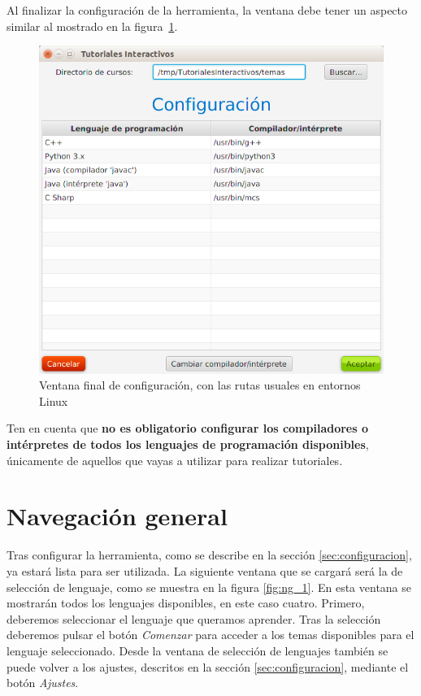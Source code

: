 \documentclass[]{article}
\begin{document}
Al finalizar la configuración de la herramienta, la ventana debe tener un aspecto similar al mostrado en la figura~\ref{fig:config3}.
%
\begin{figure}[tbp]
	\begin{center}
		\includegraphics[scale=0.4]{Configuracion_lenguajes_relleno.png}
	\end{center}
	\caption{Ventana final de configuración, con las rutas usuales en entornos Linux\label{fig:config3}}
\end{figure}
%
Ten en cuenta que \textbf{no es obligatorio configurar los compiladores o intérpretes de todos los lenguajes de programación disponibles}, únicamente de aquellos que vayas a utilizar para realizar tutoriales.

\section{Navegación general}
\label{sec:ng}
Tras configurar la herramienta, como se describe en la sección \ref{sec:configuracion}, ya estará lista para ser utilizada. La siguiente ventana que se cargará será la de selección de lenguaje, como se muestra en la figura \ref{fig:ng_1}. En esta ventana se mostrarán todos los lenguajes disponibles, en este caso cuatro. Primero, deberemos seleccionar el lenguaje que queramos aprender. Tras la selección deberemos pulsar el botón \emph{Comenzar} para acceder a los temas disponibles para el lenguaje seleccionado. Desde la ventana de selección de lenguajes también se puede volver a los ajustes, descritos en la sección \ref{sec:configuracion}, mediante el botón \emph{Ajustes}.
\end{document}
